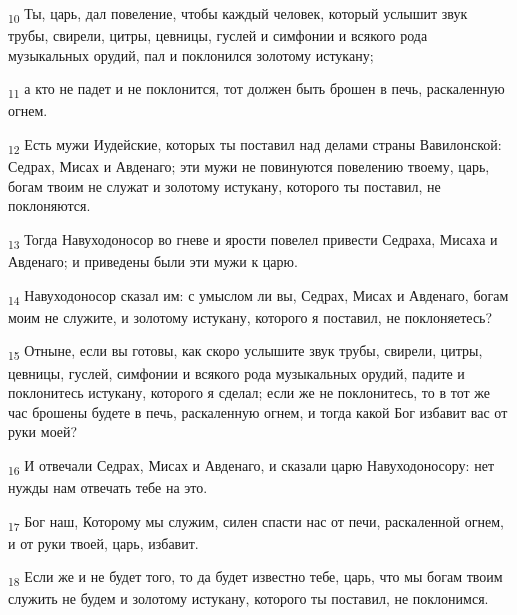 \begin{tcolorbox}
\textsubscript{10} Ты, царь, дал повеление, чтобы каждый человек, который услышит звук трубы, свирели, цитры, цевницы, гуслей и симфонии и всякого рода музыкальных орудий, пал и поклонился золотому истукану;
\end{tcolorbox}
\begin{tcolorbox}
\textsubscript{11} а кто не падет и не поклонится, тот должен быть брошен в печь, раскаленную огнем.
\end{tcolorbox}
\begin{tcolorbox}
\textsubscript{12} Есть мужи Иудейские, которых ты поставил над делами страны Вавилонской: Седрах, Мисах и Авденаго; эти мужи не повинуются повелению твоему, царь, богам твоим не служат и золотому истукану, которого ты поставил, не поклоняются.
\end{tcolorbox}
\begin{tcolorbox}
\textsubscript{13} Тогда Навуходоносор во гневе и ярости повелел привести Седраха, Мисаха и Авденаго; и приведены были эти мужи к царю.
\end{tcolorbox}
\begin{tcolorbox}
\textsubscript{14} Навуходоносор сказал им: с умыслом ли вы, Седрах, Мисах и Авденаго, богам моим не служите, и золотому истукану, которого я поставил, не поклоняетесь?
\end{tcolorbox}
\begin{tcolorbox}
\textsubscript{15} Отныне, если вы готовы, как скоро услышите звук трубы, свирели, цитры, цевницы, гуслей, симфонии и всякого рода музыкальных орудий, падите и поклонитесь истукану, которого я сделал; если же не поклонитесь, то в тот же час брошены будете в печь, раскаленную огнем, и тогда какой Бог избавит вас от руки моей?
\end{tcolorbox}
\begin{tcolorbox}
\textsubscript{16} И отвечали Седрах, Мисах и Авденаго, и сказали царю Навуходоносору: нет нужды нам отвечать тебе на это.
\end{tcolorbox}
\begin{tcolorbox}
\textsubscript{17} Бог наш, Которому мы служим, силен спасти нас от печи, раскаленной огнем, и от руки твоей, царь, избавит.
\end{tcolorbox}
\begin{tcolorbox}
\textsubscript{18} Если же и не будет того, то да будет известно тебе, царь, что мы богам твоим служить не будем и золотому истукану, которого ты поставил, не поклонимся.
\end{tcolorbox}
